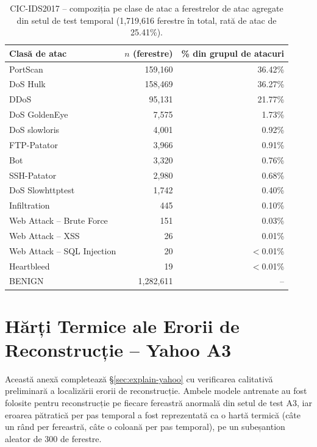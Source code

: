 \begin{table}[H]
\centering
\begin{tabular}{@{}lrr@{}}
\toprule
Clasă de atac & $n$ (ferestre) & \% din grupul de atacuri \\
\midrule
PortScan            & 159{,}160 & 36.42\% \\
DoS Hulk            & 158{,}469 & 36.27\% \\
DDoS                & 95{,}131  & 21.77\% \\
DoS GoldenEye       & 7{,}575   & 1.73\%  \\
DoS slowloris       & 4{,}001   & 0.92\%  \\
FTP-Patator         & 3{,}966   & 0.91\%  \\
Bot                 & 3{,}320   & 0.76\%  \\
SSH-Patator         & 2{,}980   & 0.68\%  \\
DoS Slowhttptest    & 1{,}742   & 0.40\%  \\
Infiltration        & 445       & 0.10\%  \\
Web Attack -- Brute Force & 151 & 0.03\%  \\
Web Attack -- XSS    & 26        & 0.01\%  \\
Web Attack -- SQL Injection & 20 & $<$0.01\% \\
Heartbleed          & 19        & $<$0.01\% \\
\midrule
BENIGN              & 1{,}282{,}611 & -- \\
\bottomrule
\end{tabular}
\caption{CIC-IDS2017 -- compoziția pe clase de atac a ferestrelor de atac agregate din setul de test temporal (1{,}719{,}616 ferestre în total, rată de atac de 25.41\%).}
\label{tab:cic-composition-temporal}
\end{table}



\chapter{Hărți Termice ale Erorii de Reconstrucție -- Yahoo A3}
\label{ch:yahoo-heatmap-appendix}

Această anexă completează \S\ref{sec:explain-yahoo} cu verificarea calitativă preliminară a localizării erorii de reconstrucție. Ambele modele antrenate au fost folosite pentru reconstrucție pe fiecare fereastră anormală din setul de test A3, iar eroarea pătratică per pas temporal a fost reprezentată ca o hartă termică (câte un rând per fereastră, câte o coloană per pas temporal), pe un subeșantion aleator de 300 de ferestre.

